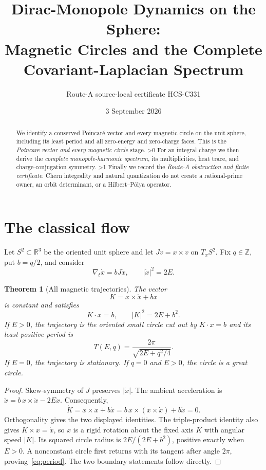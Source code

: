 \documentclass[10pt]{article}
\title{Dirac-Monopole Dynamics on the Sphere:\\Magnetic Circles and the Complete Covariant-Laplacian Spectrum}
\author{Route-A source-local certificate HCS-C331}
\date{3 September 2026}
\providecommand{\CRevisionRound}{2}
\newtheorem{theorem}{Theorem}
\newcommand{\R}{\mathbb R}
\begin{document}
\maketitle
\begin{abstract}
We identify a conserved Poincar\'e vector and every magnetic circle on the
unit sphere, including its least period and all zero-energy and zero-charge
faces.  This is the \emph{Poincare vector and every magnetic circle} stage.
\ifnum\CRevisionRound>0
For an integral charge we then derive the \emph{complete monopole-harmonic
spectrum}, its multiplicities, heat trace, and charge-conjugation symmetry.
\fi
\ifnum\CRevisionRound>1
Finally we record the \emph{Route-A obstruction and finite certificate}:
Chern integrality and natural quantization do not create a rational-prime
owner, an orbit determinant, or a Hilbert--P\'olya operator.
\fi
\end{abstract}

\section{The classical flow}
Let $S^2\subset\R^3$ be the oriented unit sphere and let
$Jv=x\times v$ on $T_xS^2$.  Fix $q\in\mathbb Z$, put $b=q/2$, and consider
\begin{equation}\label{eq:magnetic}
 \nabla_t\dot x=bJ\dot x,\qquad |\dot x|^2=2E.
\end{equation}

\begin{theorem}[All magnetic trajectories]\label{thm:classical}
The vector
\[
 K=x\times\dot x+b x
\]
is constant and satisfies
\[
 K\cdot x=b,\qquad |K|^2=2E+b^2.
\]
If $E>0$, the trajectory is the oriented small circle cut out by
$K\cdot x=b$ and its least positive period is
\begin{equation}\label{eq:period}
 T(E,q)=\frac{2\pi}{\sqrt{2E+q^2/4}}.
\end{equation}
If $E=0$, the trajectory is stationary.  If $q=0$ and $E>0$, the circle is
a great circle.
\end{theorem}

\begin{proof}
Skew-symmetry of $J$ preserves $|\dot x|$.  The ambient acceleration is
$\ddot x=b\,x\times\dot x-2E x$.  Consequently,
\[
 \dot K=x\times\ddot x+b\dot x
 =b\,x\times(x\times\dot x)+b\dot x=0.
\]
Orthogonality gives the two displayed identities.  The triple-product
identity also gives $K\times x=\dot x$, so $x$ is a rigid rotation about the
fixed axis $K$ with angular speed $|K|$.  Its squared circle radius is
$2E/(2E+b^2)$, positive exactly when $E>0$.  A nonconstant circle first
returns with its tangent after angle $2\pi$, proving~\eqref{eq:period}.
The two boundary statements follow directly.
\end{proof}
\end{document}
